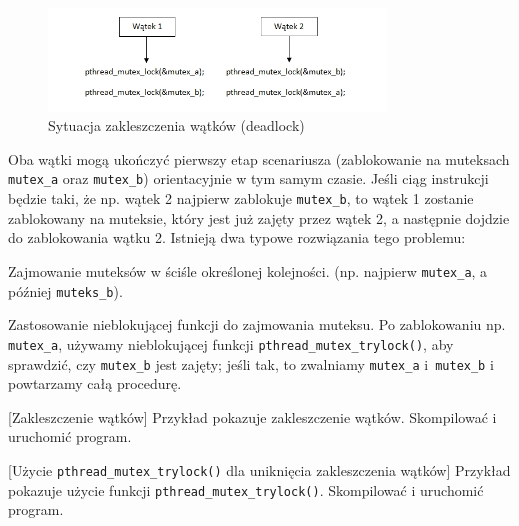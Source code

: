 \begin{figure}[!h]
\centering
\includegraphics[width=0.8\textwidth]{img/deadlock}
\caption{Sytuacja zakleszczenia wątków (deadlock)}
\label{fig:deadlock}
\end{figure}

Oba wątki mogą ukończyć pierwszy etap scenariusza (zablokowanie na muteksach  \lstinline[style=MyCStyle]{mutex_a} oraz  \lstinline[style=MyCStyle]{mutex_b}) orientacyjnie w tym samym czasie. Jeśli ciąg instrukcji będzie taki, że np. wątek 2 najpierw zablokuje  \lstinline[style=MyCStyle]{mutex_b}, to wątek 1 zostanie zablokowany na muteksie, który jest już zajęty przez wątek 2, a następnie dojdzie do zablokowania wątku 2. Istnieją dwa typowe rozwiązania tego problemu:

\begin{myitemize}
\item Zajmowanie muteksów w ściśle określonej kolejności. (np. najpierw \lstinline[style=MyCStyle]{mutex_a}, a później \lstinline[style=MyCStyle]{muteks_b}).
\item Zastosowanie nieblokującej funkcji do zajmowania muteksu. Po zablokowaniu np. \lstinline[style=MyCStyle]{mutex_a}, używamy nieblokującej funkcji \lstinline[style=MyCStyle]{pthread_mutex_trylock()}, aby sprawdzić, czy \lstinline[style=MyCStyle]{mutex_b} jest zajęty; jeśli tak, to zwalniamy \lstinline[style=MyCStyle]{mutex_a} i~\lstinline[style=MyCStyle]{mutex_b} i powtarzamy całą procedurę.
\end{myitemize}

\begin{example}{[Zakleszczenie wątków]}
Przykład pokazuje zakleszczenie wątków. Skompilować i uruchomić program.


\end{example}

\begin{example}{[Użycie \texttt{pthread\_mutex\_trylock()} dla uniknięcia zakleszczenia wątków]}
Przykład pokazuje użycie funkcji \texttt{pthread\_mutex\_trylock()}. Skompilować i uruchomić program.


\end{example}

